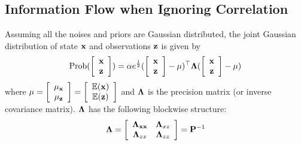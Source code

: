 \subsection{Information Flow when Ignoring Correlation}

Assuming all the noises and priors are Gaussian distributed, the joint Gaussian distribution of state $\bf x$ and observations ${\bf z}$ is given by
\begin{equation}
\text{Prob}(\left[                                             \begin{array}{c}
                                  {\bf x} \\
                                {\bf z} \\
                  \end{array}
                \right])=\alpha e^{\frac{1}{2}}(\left[
                          \begin{array}{c}
                        {\bf x} \\
                    {\bf z} \\
                  \end{array}
                \right]-{\bf\mu})^\top{\bf \Lambda}(\left[                   \begin{array}{c}
                       {\bf x} \\            
                       {\bf z} \\           \end{array}  \right]-{\bf\mu})
\end{equation}
where $\mu=\left[\begin{array}{c}               \mu_{\bf x} \\                 \mu_{\bf z} \\            \end{array}\right]=\left[\begin{array}{c}               \mathbb{E}({\bf x}) \\                 \mathbb{E}({\bf z}) \\            \end{array}\right]$ and $\bf \Lambda$ is the precision matrix (or inverse covariance matrix). ${\bf\Lambda}$ has the following blockwise structure:
\begin{equation}
{\bf \Lambda}=\left[
          \begin{array}{cc}
            {\bf \Lambda}_{\bf xx} & {\bf \Lambda}_{xz} \\
            {\bf \Lambda}_{zx} & {\bf \Lambda}_{zz} \\
          \end{array}
        \right]={\bf P}^{-1}
\end{equation}
